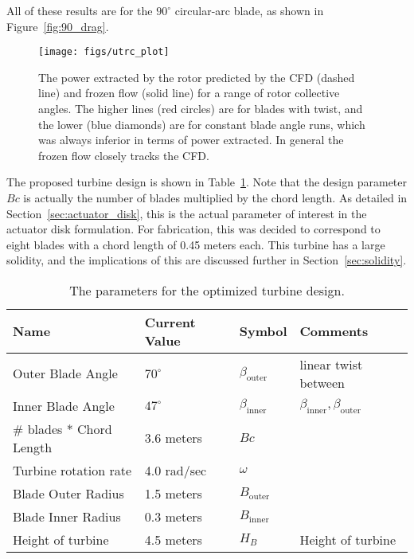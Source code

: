 All of these results are for the $90^{\circ}$ circular-arc
blade, as shown in Figure~\ref{fig:90_drag}. 

  \begin{figure}[!htb]
   \begin{center}
    \texttt{[image: figs/utrc\_plot]}
    \caption{The power extracted by the rotor predicted by the CFD
    (dashed line) and frozen flow (solid line) for a range of rotor
    collective angles. The higher lines (red circles) are for blades
    with twist, and the lower (blue diamonds) are for constant blade
    angle runs, which was always  inferior in terms of power
    extracted. In general the frozen flow closely tracks the CFD.}
    \label{fig:UTRC_turbine}
   \end{center}
  \end{figure}

The proposed turbine design is shown in Table~\ref{tab:turbine}. Note
that the design parameter $Bc $ is actually the number of blades
multiplied by the chord length. As detailed in
Section~\ref{sec:actuator_disk}, this is the actual parameter of
interest in the actuator disk formulation. For fabrication, this was 
decided to correspond to eight blades with a chord length of 0.45 meters
each. This turbine has a large solidity, and the implications of this
are discussed further in Section~\ref{sec:solidity}. 

\begin{table}[]
\centering
 \caption{The parameters for the optimized turbine design.}
\begin{tabular}{l|l|l|l}
Name                & Current Value    & Symbol           & Comments \\
 \hline
Outer Blade Angle & $70^{\circ}$ & $\beta_{\text{outer}}$  & linear twist between \\
Inner Blade Angle & $47^{\circ}$ & $\beta_\text{inner}$    & 
	     $\beta_\text{inner},\beta_\text{outer}$ \\ 
\# blades * Chord Length & 3.6 meters  & $Bc $ &  \\
Turbine rotation rate & 4.0 rad/sec  & $\omega$         &  \\
Blade Outer Radius  & 1.5 meters   & $B_\text{outer}$ &  \\
Blade Inner Radius  & 0.3 meters   & $B_\text{inner}$ &  \\
Height of turbine   & 4.5 meters   & $H_B$            & Height of turbine \\
\hline
\end{tabular}
 \label{tab:turbine}
\end{table}

